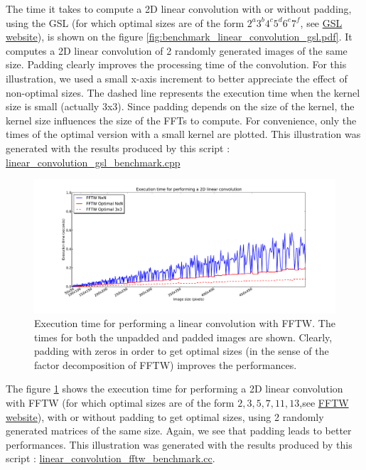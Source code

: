 \documentclass[a4paper,10pt,twoside]{article}
\begin{document}
The time it takes to compute a 2D linear convolution with or without padding, using the GSL (for which optimal sizes are of the form $2^a3^b4^c5^d6^e7^f$, see \href{http://www.gnu.org/software/gsl/manual/html_node/Mixed_002dradix-FFT-routines-for-complex-data.html}{GSL website}), is shown on the figure \ref{fig:benchmark_linear_convolution_gsl.pdf}. It computes a 2D linear convolution of 2 randomly generated images of the same size. Padding clearly improves the processing time of the convolution. For this illustration, we used a small x-axis increment to better appreciate the effect of non-optimal sizes. The dashed line represents the execution time when the kernel size is small (actually 3x3). Since padding depends on the size of the kernel, the kernel size influences the size of the FFTs to compute. For convenience, only the times of the optimal version with a small kernel are plotted. This illustration was generated with the results produced by this script : \href{http://jeremy.fix.free.fr/Software/Convolution/linear_convolution_gsl_benchmark.cc}{linear\_convolution\_gsl\_benchmark.cpp}\\

\begin{figure}[htbp]
\center \includegraphics[width=0.85\linewidth]{../Images/benchmark_linear_convolution_fftw.pdf}
\caption{\label{fig:benchmark_linear_convolution_fftw.pdf}Execution time for performing a linear convolution with FFTW. The times for both the unpadded and padded images are shown. Clearly, padding with zeros in order to get optimal sizes (in the sense of the factor decomposition of FFTW) improves the performances.}
\end{figure}

The figure \ref{fig:benchmark_linear_convolution_fftw.pdf} shows the execution time for performing a 2D linear convolution with FFTW (for which optimal sizes are of the form $2,3,5,7,11,13$,see \href{http://www.fftw.org/fftw3_doc/Complex-DFTs.html#Complex-DFTs}{FFTW website}), with or without padding to get optimal sizes, using 2 randomly generated matrices of the same size. Again, we see that padding leads to better performances. This illustration was generated with the results produced by this script : \href{http://jeremy.fix.free.fr/Software/Convolution/linear_convolution_fftw_benchmark.cpp}{linear\_convolution\_fftw\_benchmark.cc}.\\
\end{document}

